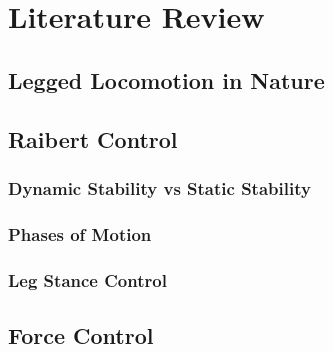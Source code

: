 \chapter{Literature Review}
\section{Legged Locomotion in Nature}
\section{Raibert Control}
\subsection{Dynamic Stability vs Static Stability}
\subsection{Phases of Motion}
\subsection{Leg Stance Control}
\section{Force Control}
